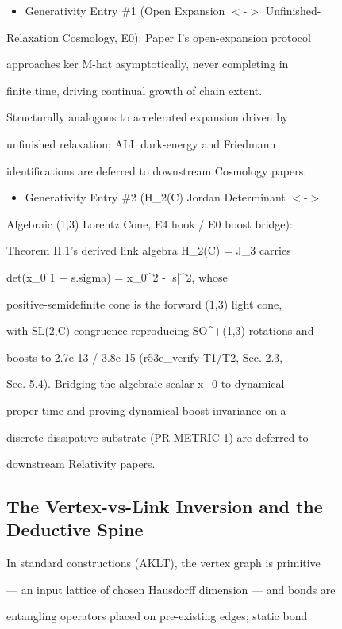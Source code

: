 \documentclass[11pt,a4paper]{article}
\theoremstyle{definition}
\begin{document}
\begin{itemize}[leftmargin=1.4em]
\item Generativity Entry \#1 (Open Expansion $<$-$>$ Unfinished-
\end{itemize}
    Relaxation Cosmology, E0): Paper I's open-expansion protocol

    approaches ker M-hat asymptotically, never completing in

    finite time, driving continual growth of chain extent.

    Structurally analogous to accelerated expansion driven by

    unfinished relaxation; ALL dark-energy and Friedmann

    identifications are deferred to downstream Cosmology papers.

\begin{itemize}[leftmargin=1.4em]
\item Generativity Entry \#2 (H\_2(C) Jordan Determinant $<$-$>$
\end{itemize}
    Algebraic (1,3) Lorentz Cone, E4 hook / E0 boost bridge):

    Theorem II.1's derived link algebra H\_2(C) = J\_3 carries

    det(x\_0 1 + s.sigma) = x\_0\^{}2 - |s|\^{}2, whose

    positive-semidefinite cone is the forward (1,3) light cone,

    with SL(2,C) congruence reproducing SO\^{}+(1,3) rotations and

    boosts to 2.7e-13 / 3.8e-15 (r53e\_verify T1/T2, Sec. 2.3,

    Sec. 5.4). Bridging the algebraic scalar x\_0 to dynamical

    proper time and proving dynamical boost invariance on a

    discrete dissipative substrate (PR-METRIC-1) are deferred to

    downstream Relativity papers.


\subsection{The Vertex-vs-Link Inversion and the Deductive Spine}

In standard constructions (AKLT), the vertex graph is primitive

— an input lattice of chosen Hausdorff dimension — and bonds are

entangling operators placed on pre-existing edges; static bond
\end{document}
